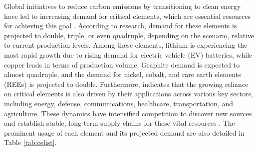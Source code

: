 \documentclass[11pt,a4paper,]{article}
\begin{document}
Global initiatives to reduce carbon emissions by transitioning to clean energy have led to increasing demand for critical elements, which are essential resources for achieving this goal \autocite{IEA2021,Wang2022}. According to \textcite{IEA2024} research, demand for these elements is projected to double, triple, or even quadruple, depending on the scenario, relative to current production levels. Among these elements, lithium is experiencing the most rapid growth due to rising demand for electric vehicle (EV) batteries, while copper leads in terms of production volume. Graphite demand is expected to almost quadruple, and the demand for nickel, cobalt, and rare earth elements (REEs) is projected to double. Furthermore, \textcite{Fortier2018} indicates that the growing reliance on critical elements is also driven by their applications across various key sectors, including energy, defense, communications, healthcare, transportation, and agriculture. These dynamics have intensified competition to discover new sources and establish stable, long-term supply chains for these vital resources \autocite{Emsbo2021}. The prominent usage of each element and its projected demand are also detailed in Table \ref{tab:celist}.

\begingroup\fontsize{9}{11}\selectfont
\end{document}
